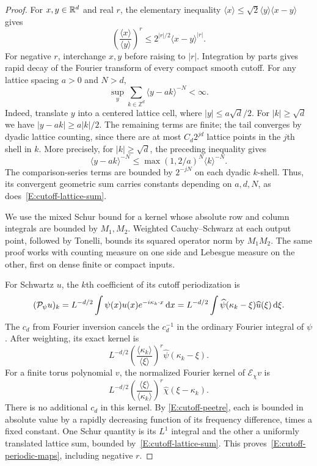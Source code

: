 \begin{proof}
  For $x,y \in \mathbb{R}^d$ and real $r$, the elementary inequality
  $\langle x\rangle\le\sqrt{2}\langle y\rangle\langle x-y\rangle$ gives
  \begin{equation}\label{E:cutoff-peetre}
    \left(\frac{\langle x\rangle}{\langle y\rangle}\right)^r
    \le 2^{|r|/2}\langle x-y\rangle^{|r|}.
  \end{equation}
  For negative $r$, interchange $x,y$ before raising to $|r|$. Integration
  by parts gives rapid decay of the Fourier transform of every compact
  smooth cutoff. For any lattice spacing $a > 0$ and $N > d$,
  \begin{equation}\label{E:cutoff-lattice-sum}
    \sup_y\sum_{k\in\mathbb Z^d}\langle y-ak\rangle^{-N}<\infty.
  \end{equation}
  Indeed, translate $y$ into a centered lattice cell, where
  $|y|\le a\sqrt d/2$. For $|k|\ge\sqrt d$ we have
  $|y-ak|\ge a|k|/2$. The remaining terms are finite; the tail converges
  by dyadic lattice counting, since there are at most $C_d2^{jd}$ lattice
  points in the $j$th shell in $k$. More precisely, for
  $|k|\ge\sqrt d$, the preceding inequality gives
  \[
    \langle y-ak\rangle^{-N}
    \le \max(1,2/a)^N\langle k\rangle^{-N}.
  \]
  The comparison-series terms are bounded by $2^{-jN}$ on each dyadic
  $k$-shell. Thus, its convergent geometric sum carries constants depending
  on $a,d,N$, as does~\eqref{E:cutoff-lattice-sum}.

  We use the mixed Schur bound for a kernel whose absolute row and column
  integrals are bounded by $M_1,M_2$. Weighted Cauchy--Schwarz at each
  output point, followed by Tonelli, bounds its squared operator norm by
  $M_1M_2$. The same proof works with counting measure on one side and
  Lebesgue measure on the other, first on dense finite or compact inputs.

  For Schwartz $u$, the $k$th coefficient of its cutoff periodization is
  \[
    (\mathcal P_\psi u)_k
    = L^{-d/2}\int\psi(x)u(x)e^{-i\kappa_k\cdot x}\,\mathrm{d} x
    = L^{-d/2}\int\widehat\psi(\kappa_k-\xi)\widehat u(\xi)\,\mathrm{d}\xi.
  \]
  The $c_d$ from Fourier inversion cancels the $c_d^{-1}$ in the ordinary
  Fourier integral of $\psi$. After weighting, its exact kernel is
  \[
    L^{-d/2}\left(\frac{\langle\kappa_k\rangle}{\langle\xi\rangle}\right)^r
    \widehat\psi(\kappa_k-\xi).
  \]
  For a finite torus polynomial $v$, the normalized Fourier kernel of
  $\mathcal E_\chi v$ is
  \[
    L^{-d/2}\left(\frac{\langle\xi\rangle}{\langle\kappa_k\rangle}\right)^r
    \widehat\chi(\xi-\kappa_k).
  \]
  There is no additional $c_d$ in this kernel. By
  \eqref{E:cutoff-peetre}, each is bounded in absolute value by a rapidly
  decreasing function of its frequency difference, times a fixed constant.
  One Schur quantity is its $L^1$ integral and the other a uniformly
  translated lattice sum, bounded by~\eqref{E:cutoff-lattice-sum}.
  This proves~\eqref{E:cutoff-periodic-maps}, including negative $r$.


\end{proof}
